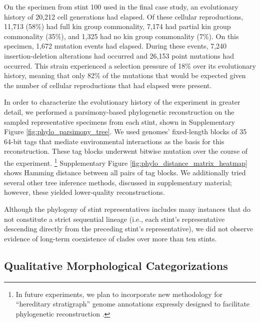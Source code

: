 On the specimen from stint 100 used in the final case study, an evolutionary history of 20,212 cell generations had elapsed.
Of these cellular reproductions, 11,713 (58\%) had full kin group commonality, 7,174 had partial kin group commonality (35\%), and 1,325 had no kin group commonality (7\%).
On this specimen, 1,672 mutation events had elapsed.
During these events, 7,240 insertion-deletion alterations had occurred and 26,153 point mutations had occurred.
This strain experienced a selection pressure of 18\% over its evolutionary history, meaning that only 82\% of the mutations that would be expected given the number of cellular reproductions that had elapsed were present.

In order to characterize the evolutionary history of the experiment in greater detail, we performed a parsimony-based phylogenetic reconstruction on the sampled representative specimens from each stint, shown in Supplementary Figure \ref{fig:phylo_parsimony_tree}.
We used genomes' fixed-length blocks of 35 64-bit tags that mediate environmental interactions as the basis for this reconstruction.
These tag blocks underwent bitwise mutation over the course of the experiment.%
\footnote{
In future experiments, we plan to incorporate new methodology for ``hereditary stratigraph'' genome annotations expressly designed to facilitate phylogenetic reconstruction .
}
Supplementary Figure \ref{fig:phylo_distance_matrix_heatmap} shows Hamming distance between all pairs of tag blocks.
We additionally tried several other tree inference methods, discussed in supplementary material; however, these yielded lower-quality reconstructions.

Although the phylogeny of stint representatives includes many instances that do not constitute a strict sequential lineage (i.e., each stint's representative descending directly from the preceding stint's representative), we did not observe evidence of long-term coexistence of clades over more than ten stints.

\subsection{Qualitative Morphological Categorizations}


